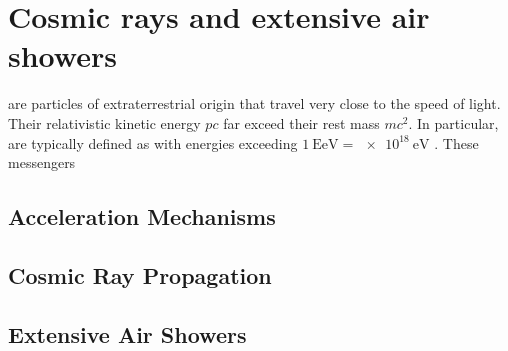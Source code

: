 
\chapter{Cosmic rays and extensive air showers}
\label{chap:cosmic-rays}

\CRs are particles of extraterrestrial origin that travel very close to the 
speed of light. Their relativistic kinetic energy $pc$ far exceed their rest 
mass $mc^2$. In particular, \UHECRs are typically defined as \CRs with energies
exceeding $\SI{1}{\exa\eV} = \SI{e18}{\eV}$ \cite{AlvesBatista2019}. These
messengers 

\section{Acceleration Mechanisms}
\label{sec:cr-accelerators}



\section{Cosmic Ray Propagation}
\label{sec:cr-propagation}



\section{Extensive Air Showers}
\label{sec:extensive-air-showers}

